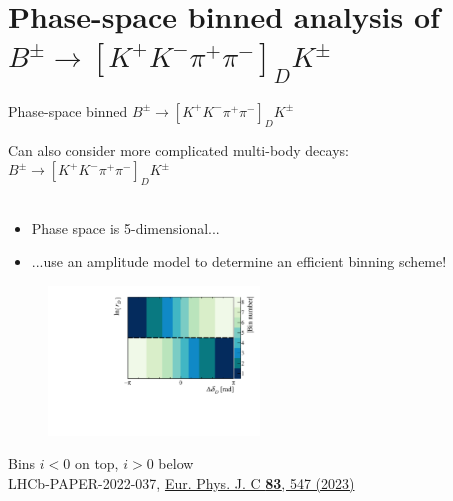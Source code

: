 \documentclass[xcolor={dvipsnames}]{beamer}
\begin{document}
\section{Phase-space binned analysis of \texorpdfstring{$B^\pm\to[K^+K^-\pi^+\pi^-]_DK^\pm$}{B2DKD2KKpipi}}
\begin{frame}{Phase-space binned $B^\pm\to[K^+K^-\pi^+\pi^-]_DK^\pm$}
  \begin{center}
    {\Large Can also consider more complicated multi-body decays: $B^\pm\to[K^+K^-\pi^+\pi^-]_DK^\pm$}\\~\\
  \end{center}
  \vspace{-0.5cm}
  \begin{itemize}
    \setlength\itemsep{0.0em}
    \item{Phase space is 5-dimensional...}
    \item{...use an amplitude model to determine an efficient binning scheme!}
  \end{itemize}
  \vspace{-0.2cm}
  \begin{figure}
    \centering
    \includegraphics[width = 0.5\textwidth]{Plots/BinningSchemePlot_8Bins.pdf}
  \end{figure}
  \vspace{-0.5cm}
  \begin{center}
    Bins $i < 0$ on top, $i > 0$ below\\
    LHCb-PAPER-2022-037, \href{https://link.springer.com/article/10.1140/epjc/s10052-023-11560-5}{Eur. Phys. J. C \textbf{83}, 547 (2023)}
  \end{center}
\end{frame}
\end{document}
